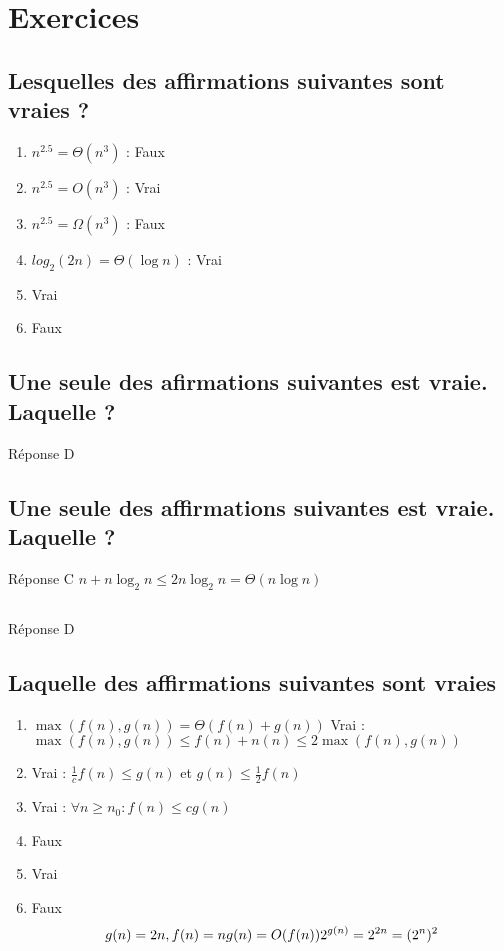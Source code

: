 \chapter{Exercices}
\section{Lesquelles des affirmations suivantes sont vraies ?}
\begin{enumerate}
	\item $n^2.5 = \Theta(n^3)$ : Faux 
	\item $n^2.5 = O(n^3)$ : Vrai 
	\item $n^2.5 = \Omega(n^3)$ : Faux
	\item $log_2(2n) = \Theta(\log n)$ : Vrai
	\item Vrai
	\item Faux
\end{enumerate}
\section{Une seule des afirmations suivantes est vraie. Laquelle ?}
Réponse D
\section{Une seule des affirmations suivantes est vraie. Laquelle ?}
Réponse C
$n + n\log_2 n \leq 2 n\log_2 n= \Theta(n \log n)$
\section{}
Réponse D
\section{Laquelle des affirmations suivantes sont vraies}
\begin{enumerate}
	\item $\max{(f(n),g(n))} = \Theta(f(n)+g(n))$ Vrai : $\max (f(n), g(n)) \leq f(n) + n(n) \leq 2 \max(f(n),g(n))$
	\item Vrai : $\frac{1}{c}f(n) \leq g(n)$ et $g(n) \leq \frac{1}{2}f(n)$
	\item Vrai : $\forall n \geq n_0 : f(n) \leq c g(n)$
	\item Faux
	\item Vrai
	\item Faux \\
		$$g(n) = 2n, f(n) = n\\ g(n) = O(f(n))\\ 2^{g(n)} = 2^{2n} = (2^n)^2$$
\end{enumerate}

